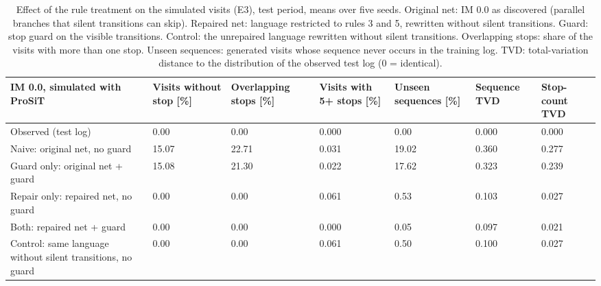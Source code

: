 \begin{table}[htbp]
\centering
\scriptsize
\setlength{\tabcolsep}{3pt}
\begin{tabularx}{\textwidth}{L{3.4cm}YYYYYY}
\toprule
\textbf{IM 0.0, simulated with ProSiT} & \textbf{Visits without stop [\%]} & \textbf{Overlapping stops [\%]} & \textbf{Visits with 5+ stops [\%]} & \textbf{Unseen sequences [\%]} & \textbf{Sequence TVD} & \textbf{Stop-count TVD} \\
\midrule
Observed (test log) & 0.00 & 0.00 & 0.000 & 0.00 & 0.000 & 0.000 \\
\midrule
Naive: original net, no guard & 15.07 & 22.71 & 0.031 & 19.02 & 0.360 & 0.277 \\
Guard only: original net + guard & 15.08 & 21.30 & 0.022 & 17.62 & 0.323 & 0.239 \\
Repair only: repaired net, no guard & 0.00 & 0.00 & 0.061 & 0.53 & 0.103 & 0.027 \\
Both: repaired net + guard & 0.00 & 0.00 & 0.000 & 0.05 & 0.097 & 0.021 \\
\midrule
Control: same language without silent transitions, no guard & 0.00 & 0.00 & 0.061 & 0.50 & 0.100 & 0.027 \\
\bottomrule
\end{tabularx}
\caption{Effect of the rule treatment on the simulated visits (E3), test period, means over five seeds. Original net: IM 0.0 as discovered (parallel branches that silent transitions can skip). Repaired net: language restricted to rules 3 and 5, rewritten without silent transitions. Guard: stop guard on the visible transitions. Control: the unrepaired language rewritten without silent transitions. Overlapping stops: share of the visits with more than one stop. Unseen sequences: generated visits whose sequence never occurs in the training log. TVD: total-variation distance to the distribution of the observed test log (0 = identical).}
\label{tab:app_rewritten_2x2_im}
\end{table}
